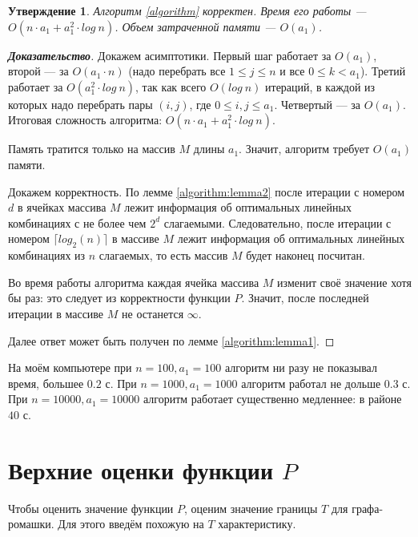 \documentclass[12pt]{article}
\newtheorem{proposition}[theorem]{Утверждение}
\begin{document}
\begin{proposition}
Алгоритм \ref{algorithm} корректен. Время его работы --- $O(n \cdot a_1 + a_1^2 \cdot log \ n)$. Объем затраченной памяти --- $O(a_1)$.
\end{proposition}
\begin{proof}[\textbf{Доказательство}]
Докажем асимптотики. Первый шаг работает за $O(a_1)$, второй --- за $O(a_1 \cdot n)$ (надо перебрать все $1 \le j \le n$ и все $0 \le k < a_1$). Третий работает за $O(a_1^2 \cdot log \ n)$, так как всего $O(log \ n)$ итераций, в каждой из которых надо перебрать пары $(i, j)$, где $0 \le i, j \le a_1$. Четвертый --- за $O(a_1)$. Итоговая сложность алгоритма: $O(n \cdot a_1 + a_1^2 \cdot log \ n)$.

Память тратится только на массив $M$ длины $a_1$. Значит, алгоритм требует $O(a_1)$ памяти.

Докажем корректность. По лемме \ref{algorithm:lemma2} после итерации с номером $d$ в ячейках массива $M$ лежит информация об оптимальных линейных комбинациях с не более чем $2^d$ слагаемыми. Следовательно, после итерации с номером $\lceil log_2(n) \rceil$ в массиве $M$ лежит информация об оптимальных линейных комбинациях из $n$ слагаемых, то есть массив $M$ будет наконец посчитан.

Во время работы алгоритма каждая ячейка массива $M$ изменит своё значение хотя бы раз: это следует из корректности функции $P$. Значит, после последней итерации в массиве $M$ не останется $\infty$.

Далее ответ может быть получен по лемме \ref{algorithm:lemma1}.
\end{proof}

На моём компьютере при $n = 100, a_1 = 100$ алгоритм ни разу не показывал время, большее $0.2$ с. При $n = 1000, a_1 = 1000$ алгоритм работал не дольше $0.3$ с. При $n = 10000, a_1 = 10000$ алгоритм работает существенно медленнее: в районе $40$ с.

\section{Верхние оценки функции $P$}

Чтобы оценить значение функции $P$, оценим значение границы $T$ для графа-ромашки. Для этого введём похожую на $T$ характеристику.
\end{document}
